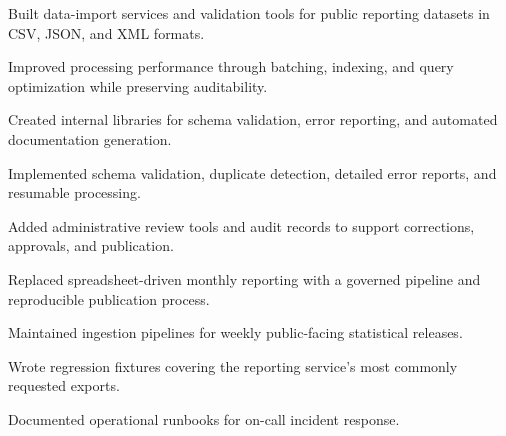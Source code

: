 \documentclass[fontsize=11pt, margin=narrow, medium=print]{careerdossier-resume}
\begin{document}
\begin{CDossierEntry}[title = {Engineer}, organization = {Public Data Analytics Incorporated}, location = {Waterloo, ON}, dates = {2016--2019}]
  \begin{CDossierItemize}
    \item Built data-import services and validation tools for public reporting datasets in CSV, JSON, and XML formats.
    \item Improved processing performance through batching, indexing, and query optimization while preserving auditability.
    \item Created internal libraries for schema validation, error reporting, and automated documentation generation.
  \end{CDossierItemize}
\end{CDossierEntry}
\begin{CDossierEntry}[title = {Associate Engineer}, organization = {Regional Data Cooperative}, location = {Kitchener, ON}, dates = {2013--2016}]
  \begin{CDossierItemize}
    \item Implemented schema validation, duplicate detection, detailed error reports, and resumable processing.
    \item Added administrative review tools and audit records to support corrections, approvals, and publication.
    \item Replaced spreadsheet-driven monthly reporting with a governed pipeline and reproducible publication process.
  \end{CDossierItemize}
\end{CDossierEntry}
\begin{CDossierEntry}[title = {Junior Engineer}, organization = {Lakeshore Analytics Group}, location = {Hamilton, ON}, dates = {2011--2013}]
  \begin{CDossierItemize}
    \item Maintained ingestion pipelines for weekly public-facing statistical releases.
    \item Wrote regression fixtures covering the reporting service's most commonly requested exports.
    \item Documented operational runbooks for on-call incident response.
  \end{CDossierItemize}
\end{CDossierEntry}
\end{document}
